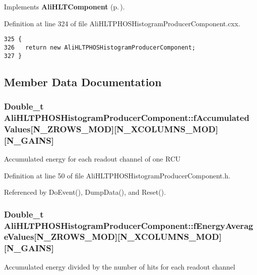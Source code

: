 Implements {\bf Ali\-HLTComponent} {\rm (p.\,\pageref{classAliHLTComponent_a13})}.

Definition at line 324 of file Ali\-HLTPHOSHistogram\-Producer\-Component.cxx.

\footnotesize\begin{verbatim}325 {
326   return new AliHLTPHOSHistogramProducerComponent;
327 }
\end{verbatim}\normalsize 




\subsection{Member Data Documentation}
\subsubsection{\setlength{\rightskip}{0pt plus 5cm}Double\_\-t {\bf Ali\-HLTPHOSHistogram\-Producer\-Component::f\-Accumulated\-Values}[N\_\-ZROWS\_\-MOD][N\_\-XCOLUMNS\_\-MOD][N\_\-GAINS]\hspace{0.3cm}{\tt  [private]}}\label{classAliHLTPHOSHistogramProducerComponent_r1}


Accumulated energy for each readout channel of one RCU 

Definition at line 50 of file Ali\-HLTPHOSHistogram\-Producer\-Component.h.

Referenced by Do\-Event(), Dump\-Data(), and Reset().
\subsubsection{\setlength{\rightskip}{0pt plus 5cm}Double\_\-t {\bf Ali\-HLTPHOSHistogram\-Producer\-Component::f\-Energy\-Average\-Values}[N\_\-ZROWS\_\-MOD][N\_\-XCOLUMNS\_\-MOD][N\_\-GAINS]\hspace{0.3cm}{\tt  [private]}}\label{classAliHLTPHOSHistogramProducerComponent_r0}


Accumulated energy divided by the number of hits for each readout channel 


